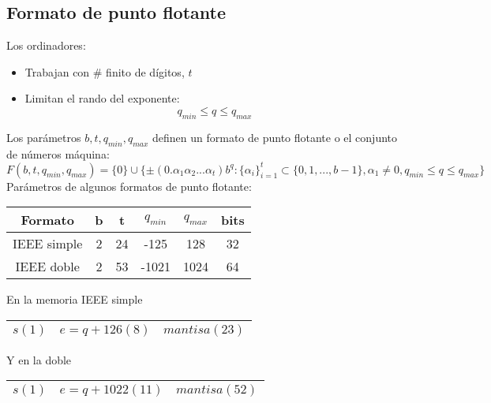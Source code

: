 \documentclass[11pt]{article}
\theoremstyle{plain}
\begin{document}
        \subsection{Formato de punto flotante} %
        \label{sub:formato_de_punto_flotante}
            Los ordinadores:
            \begin{itemize}
                \item Trabajan con \# finito de dígitos, $t$
                \item Limitan el rando del exponente: \[q_{min} \le q \le q_{max}\]
            \end{itemize}
            Los parámetros $b,t,q_{min},q_{max}$ definen un formato de punto flotante o el conjunto de números máquina:
            \begin{equation}
                 F(b,t,q_{min},q_{max}) = \{0\} \cup \{\pm (0.\alpha_1 \alpha_2 ... \alpha_t) b^q : \{ \alpha_i\}_{i=1}^{t} \subset \{0,1,...,b-1\}, \alpha_1\ne0, q_{min} \le q \le q_{max}\}
            \end{equation}
            Parámetros de algunos formatos de punto flotante:\\
            \begin{center}
                \begin{tabular}{c|c c c c c}
                    Formato & b & t & $q_{min}$ & $q_{max}$ & bits\\
                    \hline
                    IEEE simple & 2 & 24 & -125 & 128 & 32\\
                    IEEE doble & 2 & 53 & -1021 & 1024 & 64\\
                \end{tabular}
            \end{center}
            En la memoria 
            IEEE simple \begin{tabular}{|c|c|c|}
            \hline
             $s(1)$ & $e = q + 126(8)$ & $mantisa(23)$\\
             \hline 
            \end{tabular}
            Y en la doble \begin{tabular}{|c|c|c|}
            \hline
             $s(1)$ & $e = q + 1022(11)$ & $mantisa(52)$\\
            \hline 
            \end{tabular}

    
\end{document}
